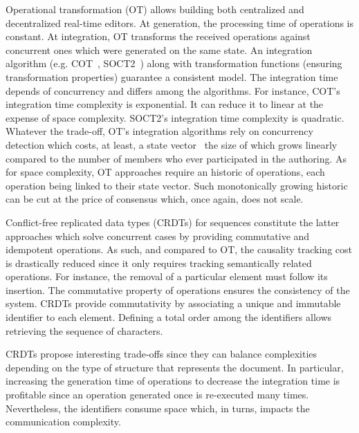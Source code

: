 \begin{asparadesc}
\item [Operational transformation] (OT) allows building both centralized and
  decentralized real-time editors. At generation, the processing time of
  operations is constant. At integration, OT transforms the received operations
  against concurrent ones which were generated on the same state. An integration
  algorithm (e.g. COT~\cite{sun2009contextbased}, SOCT2~\cite{vidot2000copies})
  along with transformation functions (ensuring transformation properties)
  guarantee a consistent model. The integration time depends of concurrency and
  differs among the algorithms.  For instance, COT's integration time complexity
  is exponential. It can reduce it to linear at the expense of space
  complexity. SOCT2's integration time complexity is quadratic.  Whatever the
  trade-off, OT's integration algorithms rely on concurrency detection which
  costs, at least, a state vector~\cite{charronbost1991concerning} the size of
  which grows linearly compared to the number of members who ever participated
  in the authoring.  As for space complexity, OT approaches
  require an historic of operations, each operation being linked to their state
  vector. Such monotonically growing historic can be cut at the price of
  consensus which, once again, does not scale.

\item [Conflict-free replicated data types] (CRDTs) for sequences constitute the
  latter approaches which solve concurrent cases by providing commutative and
  idempotent operations. As such, and compared to OT, the causality tracking
  cost is drastically reduced since it only requires tracking semantically
  related operations. For instance, the removal of a particular element must
  follow its insertion. The commutative property of operations ensures the
  consistency of the system. CRDTs provide commutativity by associating a unique
  and immutable identifier to each element. Defining a total order among the
  identifiers allows retrieving the sequence of characters. 

  CRDTs propose interesting trade-offs since they can balance complexities
  depending on the type of structure that represents the document.  In
  particular, increasing the generation time of operations to decrease the
  integration time is profitable since an operation generated once is
  re-executed many times. Nevertheless, the identifiers consume space which, in
  turns, impacts the communication complexity.


\end{asparadesc}
